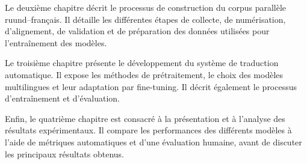 Le deuxième chapitre décrit le processus de construction du corpus parallèle ruund--français. Il détaille les différentes étapes de collecte, de numérisation, d'alignement, de validation et de préparation des données utilisées pour l'entraînement des modèles.

Le troisième chapitre présente le développement du système de traduction automatique. Il expose les méthodes de prétraitement, le choix des modèles multilingues et leur adaptation par fine-tuning. Il décrit également le processus d'entraînement et d'évaluation.

Enfin, le quatrième chapitre est consacré à la présentation et à l'analyse des résultats expérimentaux. Il compare les performances des différents modèles à l'aide de métriques automatiques et d'une évaluation humaine, avant de discuter les principaux résultats obtenus.